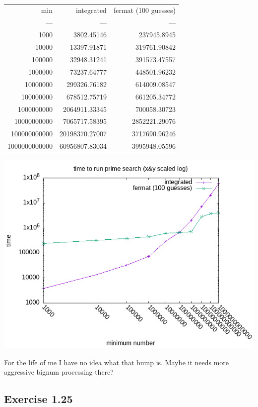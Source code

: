 \documentclass[final,fleqn,titlepage]{article}
\begin{document}
\begin{center}
\begin{tabular}{rrr}
min & integrated & fermat (100 guesses)\\
--- & --- & ---\\
1000 & 3802.45146 & 237945.8945\\
10000 & 13397.91871 & 319761.90842\\
100000 & 32948.31241 & 391573.47557\\
1000000 & 73237.64777 & 448501.96232\\
10000000 & 299326.76182 & 614009.08547\\
100000000 & 678512.75719 & 661205.34772\\
1000000000 & 2064911.33345 & 700058.30723\\
10000000000 & 7065717.58395 & 2852221.29076\\
100000000000 & 20198370.27007 & 3717690.96246\\
1000000000000 & 60956807.83034 & 3995948.05596\\
\end{tabular}
\end{center}

\begin{center}
\includegraphics[width=.9\linewidth]{1/fig/1-24-2.png}
\end{center}

For the life of me I have no idea what that bump is. Maybe it needs more
aggressive bignum processing there?

\subsection{Exercise 1.25}
\label{sec:org90a2ee8}
\end{document}
